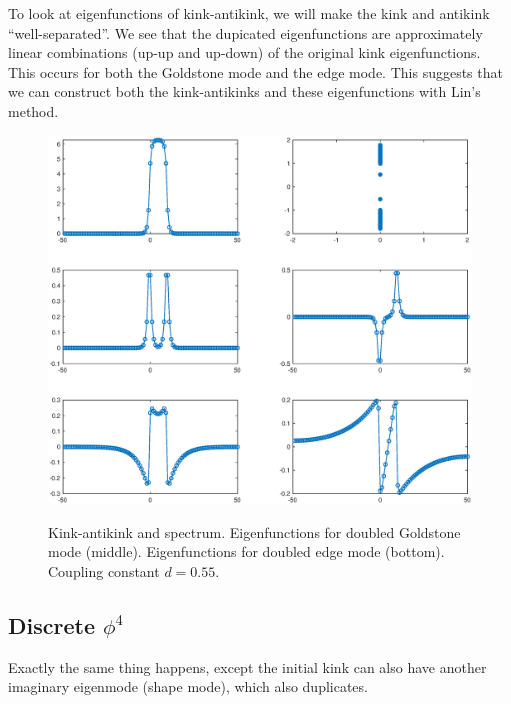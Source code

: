 \documentclass[12pt]{article}
\begin{document}
To look at eigenfunctions of kink-antikink, we will make the kink and antikink ``well-separated''. We see that the dupicated eigenfunctions are approximately linear combinations (up-up and up-down) of the original kink eigenfunctions. This occurs for both the Goldstone mode and the edge mode. This suggests that we can construct both the kink-antikinks and these eigenfunctions with Lin's method.
\begin{figure}[H]
\includegraphics[width=17cm]{kinkantikink2.eps} \\
\caption{Kink-antikink and spectrum. Eigenfunctions for doubled Goldstone mode (middle). Eigenfunctions for doubled edge mode (bottom). Coupling constant $d = 0.55$.}
\end{figure}

\subsection{Discrete $\phi^4$}

Exactly the same thing happens, except the initial kink can also have another imaginary eigenmode (shape mode), which also duplicates.
\end{document}
